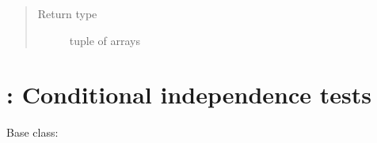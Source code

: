 \documentclass[letterpaper,10pt,english]{sphinxmanual}
\begin{document}
\begin{fulllineitems}
\begin{fulllineitems}
\begin{quote}
\begin{description}
\item[{Return type}] \leavevmode
tuple of arrays

\end{description}\end{quote}

\end{fulllineitems}


\end{fulllineitems}



\chapter{: Conditional independence tests}
\label{\detokenize{index:tigramite-independence-tests-conditional-independence-tests}}
Base class:
\end{document}
